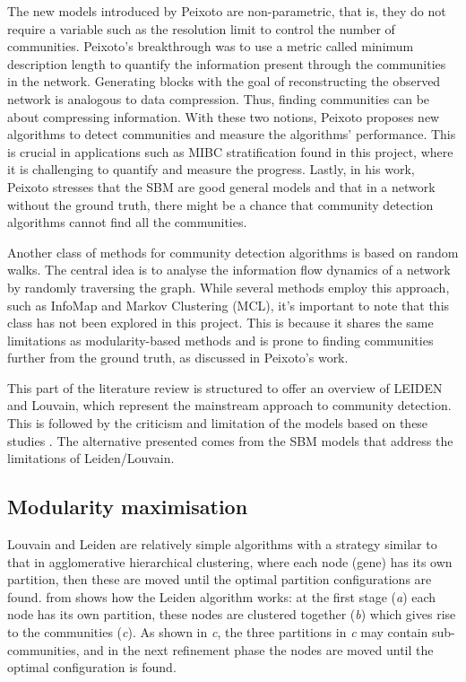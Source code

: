 The new models introduced by Peixoto are non-parametric, that is, they do not require a variable such as the resolution limit to control the number of communities. Peixoto's breakthrough was to use a metric called minimum description length to quantify the information present through the communities in the network. Generating blocks with the goal of reconstructing the observed network is analogous to data compression. Thus, finding communities can be about compressing information. With these two notions, Peixoto proposes new algorithms to detect communities and measure the algorithms' performance. This is crucial in applications such as MIBC stratification found in this project, where it is challenging to quantify and measure the progress. Lastly, in his work, Peixoto stresses that the SBM are good general models and that in a network without the ground truth, there might be a chance that community detection algorithms cannot find all the communities.

Another class of methods for community detection algorithms is based on random walks. The central idea is to analyse the information flow dynamics of a network by randomly traversing the graph. While several methods employ this approach, such as InfoMap and Markov Clustering (MCL), it's important to note that this class has not been explored in this project. This is because it shares the same limitations as modularity-based methods and is prone to finding communities further from the ground truth, as discussed in Peixoto's work. 

This part of the literature review is structured to offer an overview of \gls{LEIDEN} and \gls{Louvain}, which represent the mainstream approach to community detection. This is followed by the criticism and limitation of the models based on these studies \citep{Peixoto2023-se, Peixoto2023-rt, Shemirani2023-ww}. The alternative presented comes from the SBM models that address the limitations of Leiden/Louvain.


\subsection{Modularity maximisation} \label{s:lit:mod_max}

Louvain \citep{Blondel2008-ik} and Leiden \citep{Traag2019-ne} are relatively simple algorithms with a strategy similar to that in agglomerative hierarchical clustering, where each node (gene) has its own partition, then these are moved until the optimal partition configurations are found.  from \cite{Traag2019-ne} shows how the Leiden algorithm works: at the first stage (\textit{a}) each node has its own partition, these nodes are clustered together (\textit{b}) which gives rise to the communities (\textit{c}). As shown in \textit{c}, the three partitions in \textit{c} may contain sub-communities, and in the next refinement phase the nodes are moved until the optimal configuration is found.

